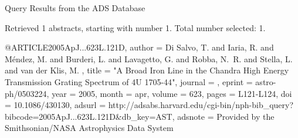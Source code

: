 Query Results from the ADS Database


Retrieved 1 abstracts, starting with number 1.  Total number selected: 1.

@ARTICLE{2005ApJ...623L.121D,
   author = {{Di Salvo}, T. and {Iaria}, R. and {M{\'e}ndez}, M. and {Burderi}, L. and 
	{Lavagetto}, G. and {Robba}, N.~R. and {Stella}, L. and {van der Klis}, M.
	},
    title = "{A Broad Iron Line in the Chandra High Energy Transmission Grating Spectrum of 4U 1705-44}",
  journal = {\apjl},
   eprint = {astro-ph/0503224},
     year = 2005,
    month = apr,
   volume = 623,
    pages = {L121-L124},
      doi = {10.1086/430130},
   adsurl = {http://adsabs.harvard.edu/cgi-bin/nph-bib_query?bibcode=2005ApJ...623L.121D&db_key=AST},
  adsnote = {Provided by the Smithsonian/NASA Astrophysics Data System}
}



